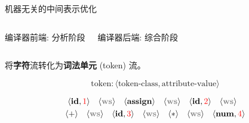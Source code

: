\begin{frame}{}
  \begin{center}

    \vspace{0.50cm}
    机器无关的中间表示优化
  \end{center}
\end{frame}

\begin{frame}{}
  \begin{columns}
      \begin{center}
        编译器前端: 分析阶段

      \end{center}
      \begin{center}
        编译器后端: 综合阶段

      \end{center}
  \end{columns}

  \pause
\end{frame}

\begin{frame}{}
  \begin{center}
     将{\bf 字符}流转化为{\bf 词法单元} (token) 流。

    \[
      \boxed{\text{token}: \langle \text{token-class}, \text{attribute-value} \rangle}
    \]

    \begin{align*}
    \langle \id, \red{1} \rangle \quad 
    \langle \ws \rangle \quad
    \langle \assign \rangle \quad
    \langle \ws \rangle \quad
    \langle \id, \red{2} \rangle \quad
    \langle \ws \rangle \quad \\
    \langle + \rangle \quad
    \langle \ws \rangle \quad
    \langle \id, \red{3} \rangle \quad
    \langle \ws \rangle \quad
    \langle \ast \rangle \quad
    \langle \ws \rangle \quad
    \langle \num, \red{4} \rangle
    \end{align*}
  \end{center}
\end{frame}

